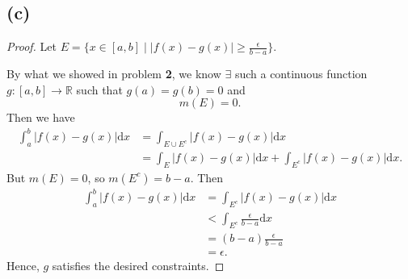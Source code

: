\documentclass{article}
\newcommand{\R}{\mathbb{R}} %
\begin{document}
\subsection*{(c)}
\begin{proof}
	Let $E = \{x\in [a, b] \;|\; |f(x) - g(x)| \geq \frac{\epsilon}{b-a}\}$. 
	
	By what we showed in problem \textbf{2}, we know $\exists$ such a continuous function $g: [a, b] \to \R$ such that  $g(a) = g(b) = 0$ and 
	\begin{equation}
		m\left(E\right) = 0.
	\end{equation}
	Then we have
	\begin{align}
		\int_a^b |f(x) - g(x)| \mathrm{d}x &= \int_{E\cup E^c} |f(x) - g(x)| \mathrm{d}x \\
		&= \int_E |f(x) - g(x)| \mathrm{d}x + \int_{E^c} |f(x) - g(x)| \mathrm{d}x.
	\end{align}
	But $m(E) = 0$, so $m(E^c) = b-a$. Then
	\begin{align}
		\int_a^b |f(x) - g(x)| \mathrm{d}x &= \int_{E^c} |f(x) - g(x)| \mathrm{d}x \\
		&< \int_{E^c} \frac{\epsilon}{b-a} \mathrm{d}x \\
		&= (b-a) \frac{\epsilon}{b-a} \\
		&= \epsilon.
	\end{align}
	Hence, $g$ satisfies the desired constraints.
\end{proof}
\end{document}
